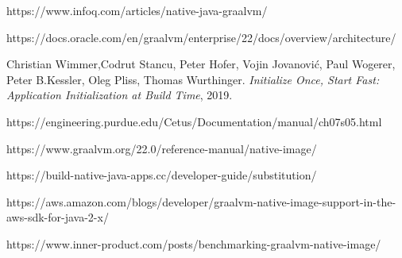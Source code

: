 \documentclass[a4paper]{article}
\begin{document}
\newpage
{}
\begin{thebibliography}{9}

https://www.infoq.com/articles/native-java-graalvm/

https://docs.oracle.com/en/graalvm/enterprise/22/docs/overview/architecture/

Christian Wimmer,Codrut Stancu, Peter Hofer, Vojin Jovanović, Paul Wogerer, Peter B.Kessler, Oleg Pliss, Thomas Wurthinger. \textit{Initialize Once, Start Fast: Application Initialization
at Build Time}, 2019.

https://engineering.purdue.edu/Cetus/Documentation/manual/ch07s05.html


https://www.graalvm.org/22.0/reference-manual/native-image/

https://build-native-java-apps.cc/developer-guide/substitution/

https://aws.amazon.com/blogs/developer/graalvm-native-image-support-in-the-aws-sdk-for-java-2-x/

https://www.inner-product.com/posts/benchmarking-graalvm-native-image/

\end{thebibliography}
\end{document}
